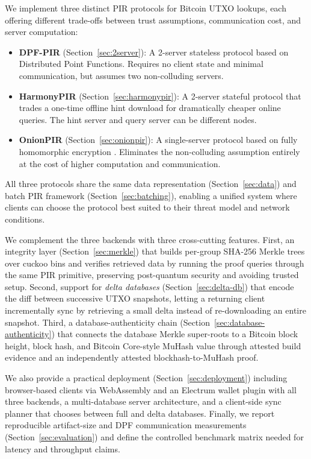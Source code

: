 We implement three distinct PIR protocols for Bitcoin UTXO lookups, each offering different trade-offs between trust assumptions, communication cost, and server computation:
\begin{itemize}[nolistsep,leftmargin=*]
    \item \textbf{DPF-PIR} (Section~\ref{sec:2server}): A 2-server stateless protocol based on Distributed Point Functions. Requires no client state and minimal communication, but assumes two non-colluding servers.
    \item \textbf{HarmonyPIR} (Section~\ref{sec:harmonypir}): A 2-server stateful protocol \cite{ar26fpe} that trades a one-time offline hint download for dramatically cheaper online queries. The hint server and query server can be different nodes.
    \item \textbf{OnionPIR} (Section~\ref{sec:onionpir}): A single-server protocol based on fully homomorphic encryption \cite{onionpir21,onionpirv2}. Eliminates the non-colluding assumption entirely at the cost of higher computation and communication.
\end{itemize}

All three protocols share the same data representation (Section~\ref{sec:data}) and batch PIR framework (Section~\ref{sec:batching}), enabling a unified system where clients can choose the protocol best suited to their threat model and network conditions.

We complement the three backends with three cross-cutting features. First, an integrity layer (Section~\ref{sec:merkle}) that builds per-group SHA-256 Merkle trees over cuckoo bins and verifies retrieved data by running the proof queries through the same PIR primitive, preserving post-quantum security and avoiding trusted setup. Second, support for \emph{delta databases} (Section~\ref{sec:delta-db}) that encode the diff between successive UTXO snapshots, letting a returning client incrementally sync by retrieving a small delta instead of re-downloading an entire snapshot. Third, a database-authenticity chain (Section~\ref{sec:database-authenticity}) that connects the database Merkle super-roots to a Bitcoin block height, block hash, and Bitcoin Core-style MuHash value through attested build evidence and an independently attested blockhash-to-MuHash proof.

We also provide a practical deployment (Section~\ref{sec:deployment}) including browser-based clients via WebAssembly \cite{wasm} and an Electrum wallet plugin \cite{electrum} with all three backends, a multi-database server architecture, and a client-side sync planner that chooses between full and delta databases. Finally, we report reproducible artifact-size and DPF communication measurements (Section~\ref{sec:evaluation}) and define the controlled benchmark matrix needed for latency and throughput claims.

